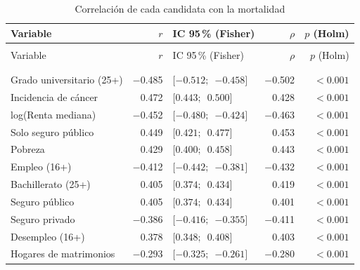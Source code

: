 {\footnotesize
\begin{xltabular}{\linewidth}{>{\raggedright\arraybackslash}X r l r r}
\caption{Correlación de cada candidata con la mortalidad}\label{tab:correlaciones} \\
\toprule
Variable & $r$ & IC 95\,\% (Fisher) & $\rho$ & $p$ (Holm) \\
\midrule
\endfirsthead
{} \\
\toprule
Variable & $r$ & IC 95\,\% (Fisher) & $\rho$ & $p$ (Holm) \\
\midrule
\endhead
\midrule
{} \\
\endfoot
\bottomrule
{} \\
\endlastfoot
Grado universitario (25+) & \num{-0.485} & $[\num{-0.512};$\allowbreak\ $\num{-0.458}]$ & \num{-0.502} & $<\num{0.001}$ \\
Incidencia de cáncer & \num{0.472} & $[\num{0.443};$\allowbreak\ $\num{0.500}]$ & \num{0.428} & $<\num{0.001}$ \\
log(Renta mediana) & \num{-0.452} & $[\num{-0.480};$\allowbreak\ $\num{-0.424}]$ & \num{-0.463} & $<\num{0.001}$ \\
Solo seguro público & \num{0.449} & $[\num{0.421};$\allowbreak\ $\num{0.477}]$ & \num{0.453} & $<\num{0.001}$ \\
Pobreza & \num{0.429} & $[\num{0.400};$\allowbreak\ $\num{0.458}]$ & \num{0.443} & $<\num{0.001}$ \\
Empleo (16+) & \num{-0.412} & $[\num{-0.442};$\allowbreak\ $\num{-0.381}]$ & \num{-0.432} & $<\num{0.001}$ \\
Bachillerato (25+) & \num{0.405} & $[\num{0.374};$\allowbreak\ $\num{0.434}]$ & \num{0.419} & $<\num{0.001}$ \\
Seguro público & \num{0.405} & $[\num{0.374};$\allowbreak\ $\num{0.434}]$ & \num{0.401} & $<\num{0.001}$ \\
Seguro privado & \num{-0.386} & $[\num{-0.416};$\allowbreak\ $\num{-0.355}]$ & \num{-0.411} & $<\num{0.001}$ \\
Desempleo (16+) & \num{0.378} & $[\num{0.348};$\allowbreak\ $\num{0.408}]$ & \num{0.403} & $<\num{0.001}$ \\
Hogares de matrimonios & \num{-0.293} & $[\num{-0.325};$\allowbreak\ $\num{-0.261}]$ & \num{-0.280} & $<\num{0.001}$ \\

\end{xltabular}}
